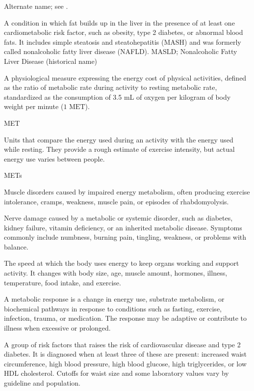  Alternate name; see .

 A condition in which fat builds up in the liver in the presence of at least one cardiometabolic risk factor, such as obesity, type 2 diabetes, or abnormal blood fats. It includes simple steatosis and steatohepatitis (MASH) and was formerly called nonalcoholic fatty liver disease (NAFLD).
\synonyms
MASLD; Nonalcoholic Fatty Liver Disease (historical name)

 A physiological measure expressing the energy cost of physical activities, defined as the ratio of metabolic rate during activity to resting metabolic rate, standardized as the consumption of 3.5 mL of oxygen per kilogram of body weight per minute ($1\text{ MET}$).

\synonyms
MET

 Units that compare the energy used during an activity with the energy used while resting. They provide a rough estimate of exercise intensity, but actual energy use varies between people.

\synonyms
METs

 Muscle disorders caused by impaired energy metabolism, often producing exercise intolerance, cramps, weakness, muscle pain, or episodes of rhabdomyolysis.

 Nerve damage caused by a metabolic or systemic disorder, such as diabetes, kidney failure, vitamin deficiency, or an inherited metabolic disease. Symptoms commonly include numbness, burning pain, tingling, weakness, or problems with balance.

 The speed at which the body uses energy to keep organs working and support activity. It changes with body size, age, muscle amount, hormones, illness, temperature, food intake, and exercise.

 A metabolic response is a change in energy use, substrate metabolism, or biochemical pathways in response to conditions such as fasting, exercise, infection, trauma, or medication. The response may be adaptive or contribute to illness when excessive or prolonged.

 A group of risk factors that raises the risk of cardiovascular disease and type 2 diabetes. It is diagnosed when at least three of these are present: increased waist circumference, high blood pressure, high blood glucose, high triglycerides, or low HDL cholesterol. Cutoffs for waist size and some laboratory values vary by guideline and population.

